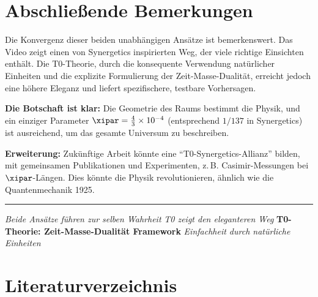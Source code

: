 	\section{Abschließende Bemerkungen}
	
	Die Konvergenz dieser beiden unabhängigen Ansätze ist bemerkenswert. Das Video zeigt einen von Synergetics inspirierten Weg, der viele richtige Einsichten enthält. Die T0-Theorie, durch die konsequente Verwendung natürlicher Einheiten und die explizite Formulierung der Zeit-Masse-Dualität, erreicht jedoch eine höhere Eleganz und liefert spezifischere, testbare Vorhersagen.
	
	\textbf{Die Botschaft ist klar:} Die Geometrie des Raums bestimmt die Physik, und ein einziger Parameter $\xipar = \frac{4}{3} \times 10^{-4}$ (entsprechend $1/137$ in Synergetics) ist ausreichend, um das gesamte Universum zu beschreiben.
	
	\textbf{Erweiterung:} Zukünftige Arbeit könnte eine ``T0-Synergetics-Allianz'' bilden, mit gemeinsamen Publikationen und Experimenten, z.\,B. Casimir-Messungen bei $\xipar$-Längen. Dies könnte die Physik revolutionieren, ähnlich wie die Quantenmechanik 1925.
	
	\vfill
	
	\begin{center}
		\hrule
		\vspace{0.5cm}
		\textit{Beide Ansätze führen zur selben Wahrheit}
		\textit{T0 zeigt den eleganteren Weg}
		\vspace{0.3cm}
		\textbf{T0-Theorie: Zeit-Masse-Dualität Framework}
		\textit{Einfachheit durch natürliche Einheiten}
		\vspace{0.3cm}
	\end{center}
	
	\section{Literaturverzeichnis}
	
